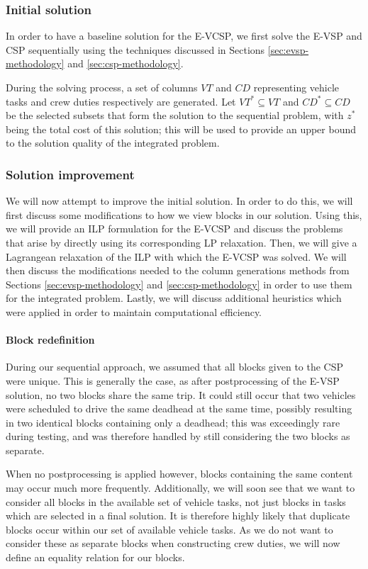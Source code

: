 \documentclass[]{article}
\begin{document}
\subsubsection{Initial solution}
In order to have a baseline solution for the E-VCSP, we first solve the E-VSP and CSP sequentially using the techniques discussed in Sections \ref{sec:evsp-methodology} and \ref{sec:csp-methodology}. 

During the solving process, a set of columns $VT$ and $CD$ representing vehicle tasks and crew duties respectively are generated. Let $VT^* \subseteq VT$ and $CD^* \subseteq CD$ be the selected subsets that form the solution to the sequential problem, with $z^*$ being the total cost of this solution; this will be used to provide an upper bound to the solution quality of the integrated problem. 

\subsubsection{Solution improvement}
We will now attempt to improve the initial solution. In order to do this, we will first discuss some modifications to how we view blocks in our solution. Using this, we will provide an ILP formulation for the E-VCSP and discuss the problems that arise by directly using its corresponding LP relaxation. Then, we will give a Lagrangean relaxation of the ILP with which the E-VCSP was solved. We will then discuss the modifications needed to the column generations methods from Sections \ref{sec:evsp-methodology} and \ref{sec:csp-methodology} in order to use them for the integrated problem. Lastly, we will discuss additional heuristics which were applied in order to maintain computational efficiency. 

\paragraph{Block redefinition} During our sequential approach, we assumed that all blocks given to the CSP were unique. This is generally the case, as after postprocessing of the E-VSP solution, no two blocks share the same trip. It could still occur that two vehicles were scheduled to drive the same deadhead at the same time, possibly resulting in two identical blocks containing only a deadhead; this was exceedingly rare during testing, and was therefore handled by still considering the two blocks as separate.

When no postprocessing is applied however, blocks containing the same content may occur much more frequently. Additionally, we will soon see that we want to consider all blocks in the available set of vehicle tasks, not just blocks in tasks which are selected in a final solution. It is therefore highly likely that duplicate blocks occur within our set of available vehicle tasks. As we do not want to consider these as separate blocks when constructing crew duties, we will now define an equality relation for our blocks. 
\end{document}
